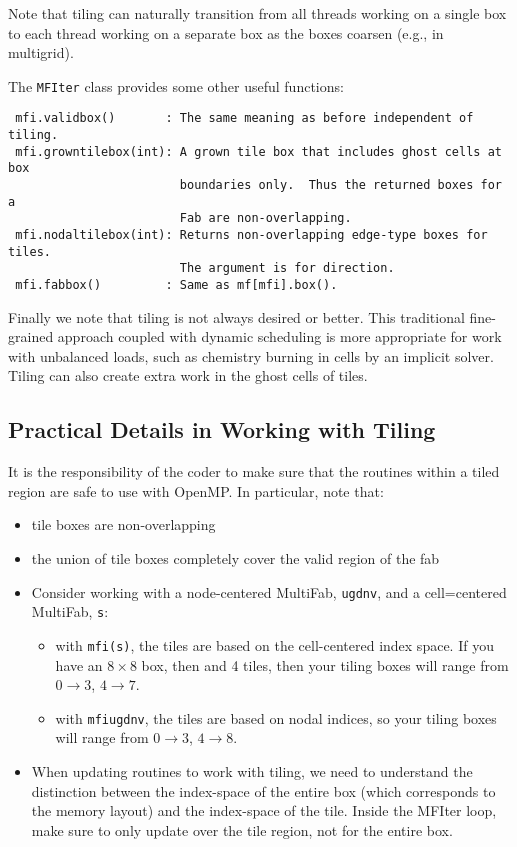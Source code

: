 Note that tiling can naturally transition from all threads working
on a single box to each thread working on a separate box as the boxes
coarsen (e.g., in multigrid).

The {\tt MFIter} class provides some other useful functions:
\begin{lstlisting}
 mfi.validbox()       : The same meaning as before independent of tiling.
 mfi.growntilebox(int): A grown tile box that includes ghost cells at box
                        boundaries only.  Thus the returned boxes for a
                        Fab are non-overlapping.
 mfi.nodaltilebox(int): Returns non-overlapping edge-type boxes for tiles.
                        The argument is for direction.
 mfi.fabbox()         : Same as mf[mfi].box().
\end{lstlisting}

Finally we note that tiling is not always desired or better.  This
traditional fine-grained approach coupled with dynamic scheduling is
more appropriate for work with unbalanced loads, such as chemistry
burning in cells by an implicit solver.  Tiling can also create extra
work in the ghost cells of tiles.


\subsection{Practical Details in Working with Tiling}

It is the responsibility of the coder to make sure that the routines within
a tiled region are safe to use with OpenMP.  In particular, note that:
\begin{itemize}
\item tile boxes are non-overlapping
\item the union of tile boxes completely cover the valid region of the fab
\item Consider working with a node-centered MultiFab, {\tt ugdnv}, and a
cell=centered MultiFab, {\tt s}:
  \begin{itemize}

  \item with {\tt mfi(s)}, the tiles are based on the cell-centered
  index space.  If you have an $8\times 8$ box, then and 4 tiles, then
  your tiling boxes will range from $0\rightarrow 3$, $4\rightarrow
  7$.

  \item with {\tt mfi{ugdnv}}, the tiles are based on nodal indices,
  so your tiling boxes will range from $0\rightarrow 3$, $4\rightarrow 8$.

  \end{itemize}  
\item When updating routines to work with tiling, we need to understand
the distinction between the index-space of the entire box (which
corresponds to the memory layout) and the index-space of the tile.
Inside the MFIter loop, make sure to only update over
  the tile region, not for the entire box.

\end{itemize}


